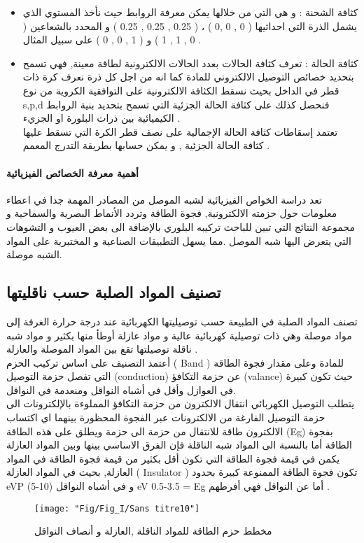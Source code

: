 \begin{enumerate}
\begin{itemize}
\begin{enumerate}
		\end{enumerate}
		\item
		كثافة الشحنة : و هي التي من خلالها يمكن معرفة الروابط حيث نأخذ المستوي الذي يشمل الذرة التي احداثيها ( 0 , 0 ,0 ) ، ( 0.25 , 0.25 , 0.25 ) و المحدد بالشعاعين ( 0 , 1 , 1 ) و ( 1 , 0 , 0 )  على سبيل المثال .
		\item
		كثافة الحالة : تعرف كثافة الحالات بعدد الحالات الالكترونية لطاقة معينة, فهي تسمح بتحديد خصائص التوصيل الالكتروني للمادة كما انه من اجل كل ذرة نعرف كرة ذات قطر في الداخل بحيث نسقط الكثافة الالكترونية على التوافقية الكروية من نوع s,p,d فنحصل كذلك على كثافة الحالة الجزئية التي تسمح بتحديد بنية الروابط الكيميائية بين ذرات البلورة او الجزيء .\\
		تعتمد إسقاطات كثافة الحالة الإجمالية على نصف قطر الكرة التي تسقط عليها كثافة الحالة الجزئية , و يمكن حسابها بطريقة التدرج المعمم .
		
	\end{itemize}
	
\end{enumerate}


\paragraph{أهمية معرفة الخصائص الفيزيائية }

تعد دراسة الخواص الفيزيائية لشبه الموصل من المصادر المهمة جدا في اعطاء معلومات حول حزمته الالكترونية, فجوة الطاقة وتردد الأنماط البصرية والسماحية و مجموعة النتائج التي تبين للباحث  تركيبه البلوري بالإضافة الى بعض العيوب و التشوهات التي يتعرض اليها شبه الموصل .مما يسهل التطبيقات الصناعية و المختبرية على المواد الشبه موصلة.

\subsection{تصنيف المواد الصلبة حسب ناقليتها }
تصنف المواد الصلبة في الطبيعة حسب توصيليتها الكهربائية عند
درجة حرارة الغرفة إلى مواد موصلة وهي ذات توصيلية كهربائية عالية و مواد عازلة أوطأ منها بكثير و مواد شبه ناقلة توصيلتها تقع بين المواد الموصلة والعازلة .\\
أعتمد التصنيف على اساس تركيب الحزم ( Band ) للمادة وعلى مقدار فجوة الطاقة التي تفصل حزمة التوصيل (conduction) عن حزمة التكافؤ (valance) حيث تكون كبيرة في العوازل وأقل في أشباه النواقل ومنعدمة في النواقل.\\
يتطلب التوصيل الكهربائي انتقال الالكترون من حزمة التكافؤ المملوءة بالإلكترونات الى حزمة التوصيل الفارغة من الالكترونات 
عبر الفجوة المحظورة بينهما اي اكتساب الالكترون طاقة للانتقال من حزمة الى حزمة ويطلق على هذه الطاقة (Eg) بفجوة الطاقة أما بالنسبة الى المواد شبه الناقلة فإن الفرق الاساسي بينها وبين المواد العازلة يكمن في قيمة فجوة الطاقة التي تكون أقل بكثير من قيمة فجوة الطاقة في المواد العازلة, بحيث  في المواد العازلة (  Insulator ) تكون فجوة الطاقة الممنوعة كبيرة بحدود eVP (5-10) و في أشباه النواقل eV 0.5-3.5  = E{g} أما عن النواقل فهي أفرطهم . 
\begin{figure}[h]
	\centering
	\texttt{[image: "Fig/Fig\_I/Sans titre10"]}
	\caption{مخطط حزم الطاقة للمواد الناقلة ,العازلة و أنصاف النواقل }
	\label{fig:sans-titre10}
\end{figure}

